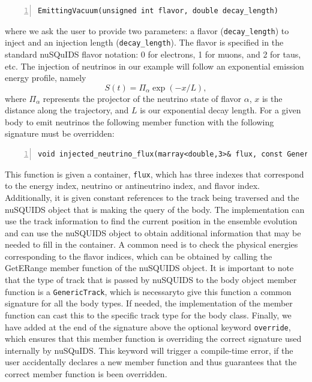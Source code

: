 \documentclass[3p,12pt]{elsarticle}
\newcommand{\ttf}{\ttfamily}
\begin{document}
\begin{lstlisting}[frame=leftline, numbers =
  left,breaklines=true,label = ex:sin1,firstnumber=last]
    EmittingVacuum(unsigned int flavor, double decay_length)
\end{lstlisting}
where we ask the user to provide two parameters: a flavor (\texttt{decay\_length}) to inject and an injection length (\texttt{decay\_length}).
The flavor is specified in the standard {\ttf nuSQuIDS} flavor notation: 0 for electrons, 1 for muons, and 2 for taus, etc.
The injection of neutrinos in our example will follow an exponential emission energy profile, namely
\begin{equation}
  S(t) = \Pi_\alpha \exp(-x/L),
\end{equation}
where $\Pi_\alpha$ represents the projector of the neutrino state of flavor $\alpha$, $x$ is the distance along the trajectory,  and $L$ is our exponential decay length.
For a given body to emit neutrinos the following member function with the following signature must be overridden:
\begin{lstlisting}[frame=leftline, numbers =
  left,breaklines=true,label = ex:sin1,firstnumber=last]
    void injected_neutrino_flux(marray<double,3>& flux, const GenericTrack& track, const nuSQUIDS& nusquids) override
\end{lstlisting}
This function is given a container, \texttt{flux}, which has three indexes that correspond to the energy index, neutrino or antineutrino index, and flavor index.
Additionally, it is given constant references to the track being traversed and the nuSQUIDS object that is making the query of the body.
The implementation can use the track information to find the current position in the ensemble evolution and can use the nuSQUIDS object
to obtain additional information that may be needed to fill in the container.
A common need is to check the physical energies corresponding to the flavor indices, which can be obtained by calling the {\ttf GetERange} member function of the {\ttf nuSQUIDS} object.
It is important to note that the type of track that is passed by nuSQUIDS to the body object member function is a \texttt{GenericTrack}, which is necessaryto give this function a common signature for all the body types. If needed, the implementation of the member function can cast this to the specific track type for the body class.
Finally, we have added at the end of the signature above the optional keyword \texttt{override}, which ensures that this member function is overriding the correct signature used
internally by {\ttf nuSQuIDS}. This keyword will trigger a compile-time error, if the user accidentally declares a new member function and thus guarantees that the correct member function
is been overridden.
\end{document}
